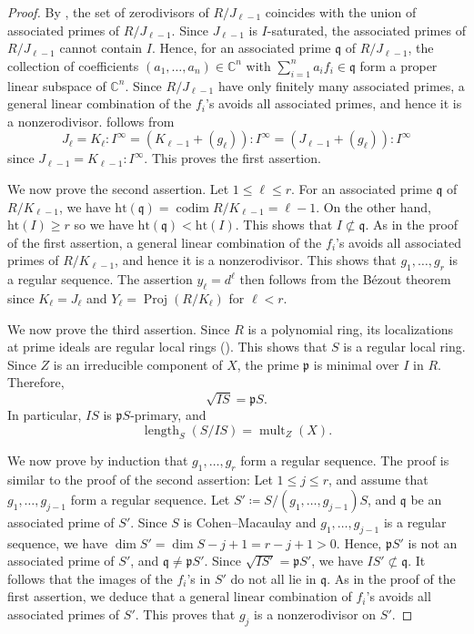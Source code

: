 \documentclass[11pt,letterpaper]{article}
\numberwithin{equation}{section}
\newcommand{\CC}{\mathbb{C}}
\newcommand{\fp}{\mathfrak{p}}
\DeclareMathOperator{\length}{length}
\DeclareMathOperator{\codim}{codim}
\DeclareMathOperator{\Proj}{Proj}
\DeclareMathOperator{\mult}{mult}
\begin{document}
\begin{proof}
By \cite[Exercise~17.3]{Eisenbud-95}, the set of zerodivisors of $R/J_{\ell-1}$ coincides with the union of associated primes of $R/J_{\ell-1}$.
    Since $J_{\ell-1}$ is $I$-saturated, the associated primes of $R/J_{\ell-1}$ cannot contain $I$.
    Hence, for an associated prime $\mathfrak{q}$ of $R/J_{\ell-1}$, the collection of coefficients $(a_1,\dots,a_n)\in\CC^n$ with $\sum_{i=1}^n a_i f_i\in \mathfrak{q}$ form a proper linear subspace of $\CC^n$.
    Since $R/J_{\ell-1}$ have only finitely many associated primes, a general linear combination of the $f_i$'s avoids all associated primes, and hence it is a nonzerodivisor.
     follows from \[
    J_\ell = K_\ell : I^{\infty} = (K_{\ell-1}+(g_\ell)):I^{\infty} = (J_{\ell-1} + (g_\ell)) : I^{\infty}
    \] since $J_{\ell-1}=K_{\ell-1}:I^{\infty}$.
    This proves the first assertion.

    We now prove the second assertion.
    Let $1\leq\ell \leq r$.
    For an associated prime $\mathfrak{q}$ of $R/K_{\ell-1}$, we have $\mathrm{ht}(\mathfrak{q})=\codim R/K_{\ell-1}=\ell-1$.
    On the other hand, $\mathrm{ht}(I)\geq r$ so we have $\mathrm{ht}(\mathfrak{q})< \mathrm{ht}(I)$.
    This shows that $I\not\subset \mathfrak{q}$.
    As in the proof of the first assertion, a general linear combination of the $f_i$'s avoids all associated primes of $R/K_{\ell-1}$, and hence it is a nonzerodivisor.
    This shows that $g_1,\dots,g_r$ is a regular sequence.
    The assertion $y_\ell=d^{\ell}$ then follows from the B\'{e}zout theorem since $K_\ell=J_\ell$ and $Y_\ell=\Proj(R/K_{\ell})$ for $\ell < r$.

    We now prove the third assertion.
    Since $R$ is a polynomial ring, its localizations at prime ideals are regular local rings (\cite[Corollary~19.14]{Eisenbud-95}).
    This shows that $S$ is a regular local ring.
    Since $Z$ is an irreducible component of $X$, the prime $\fp$ is minimal over $I$ in $R$.
    Therefore, \[
    \sqrt{IS} = \fp S.
    \] In particular, $IS$ is $\fp S$-primary, and \[
    \length_S (S/IS) = \mult_Z(X).
    \] 
    
    We now prove by induction that $g_1,\dots,g_r$ form a regular sequence.
    The proof is similar to the proof of the second assertion:
    Let $1\leq j \leq r$, and assume that $g_1,\dots,g_{j-1}$ form a regular sequence.
    Let $S'\coloneqq S/(g_1,\dots,g_{j-1})S$, and $\mathfrak{q}$ be an associated prime of $S'$.
    Since $S$ is Cohen--Macaulay and $g_1,\dots,g_{j-1}$ is a regular sequence, we have $\dim S'=\dim S-j+1=r-j+1>0$.
    Hence, $\fp S'$ is not an associated prime of $S'$, and $\mathfrak{q}\neq \fp S'$.
    Since $\sqrt{IS'}=\fp S'$, we have $IS'\not\subset \mathfrak{q}$.
    It follows that the images of the $f_i$'s in $S'$ do not all lie in $\mathfrak{q}$.
    As in the proof of the first assertion, we deduce that a general linear combination of $f_i$'s avoids all associated primes of $S'$.
    This proves that $g_j$ is a nonzerodivisor on $S'$.


\end{proof}
\end{document}

